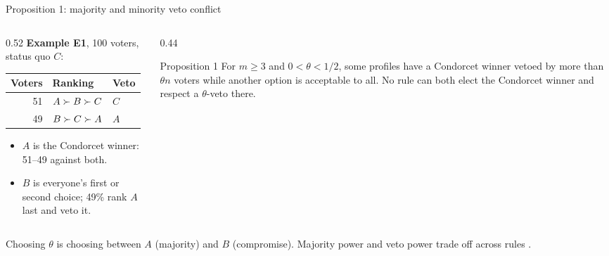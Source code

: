 \documentclass[10pt,aspectratio=169]{beamer}
\begin{document}
\begin{frame}{Proposition 1: majority and minority veto conflict}
  \begin{columns}[T]
    \begin{column}{0.52\textwidth}
      \textbf{Example E1}, 100 voters, status quo $C$:\par\smallskip
      \begin{tabular}{rll}
        \toprule
        Voters & Ranking & Veto \\
        \midrule
        51 & $A \succ B \succ C$ & $C$ \\
        49 & $B \succ C \succ A$ & $A$ \\
        \bottomrule
      \end{tabular}
      \medskip
      \begin{itemize}
        \item $A$ is the Condorcet winner: 51--49 against both.
        \item $B$ is everyone's first or second choice; 49\% rank $A$ last and veto it.
      \end{itemize}
    \end{column}
    \begin{column}{0.44\textwidth}
      \begin{block}{Proposition 1}
        For $m \ge 3$ and $0 < \theta < 1/2$, some profiles have a Condorcet winner vetoed by more than
        $\theta n$ voters while another option is acceptable to all. No rule can both elect the Condorcet
        winner and respect a $\theta$-veto there.
      \end{block}
    \end{column}
  \end{columns}
  \medskip
  \alert{Choosing $\theta$ is choosing between $A$ (majority) and $B$ (compromise).} Majority power and
  veto power trade off across rules .
\end{frame}
\end{document}
